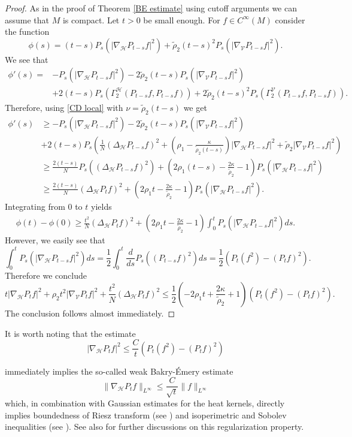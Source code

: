 \documentclass[11pt]{article}
\numberwithin{equation}{section}
\newcommand{\Ho}{\mathcal H}
\newcommand{\V}{\mathcal V}
\begin{document}
\begin{proof}
As in the proof of Theorem \ref{BE estimate} using cutoff arguments we can assume that $M$ is compact. Let $t>0$ be small enough. For $f \in C^\infty (M)$ consider the function
\[
\phi(s)= (t-s)P_s(|\nabla_\Ho P_{t-s} f|^2)+\tilde\rho_2 (t-s)^2 P_s(|\nabla_\V P_{t-s} f|^2).
\]
We see that
\begin{align*}
\phi'(s)=&-P_s(|\nabla_\Ho P_{t-s} f|^2)-2\tilde\rho_2 (t-s)P_s(|\nabla_\V P_{t-s} f|^2) \\
&+2(t-s)P_s(\Gamma^\Ho_2 (P_{t-s}f,P_{t-s} f))+2\tilde\rho_2 (t-s)^2 P_s( \Gamma_2^\V (P_{t-s} f,P_{t-s}f)).
\end{align*}
Therefore, using \eqref{CD local} with $\nu=\tilde\rho_2 (t-s)$ we get
\begin{align*}
\phi'(s) &\ge -P_s(|\nabla_\Ho P_{t-s} f|^2)-2\tilde\rho_2 (t-s)P_s(|\nabla_\V P_{t-s} f|^2) \\
&+2(t-s) P_s  \left( \frac{1}{N}(\Delta_\Ho P_{t-s}f)^2 +\left(\rho_1-\frac{\kappa}{\tilde \rho_2 (t-s)} \right) | \nabla_\Ho P_{t-s}f|^2+ \tilde{\rho}_2 | \nabla_\V P_{t-s}f|^2\right) \\
 &\ge \frac{2(t-s)}{N} P_s  \left( (\Delta_\Ho P_{t-s}f)^2\right)+ \left(2\rho_1(t-s)-\frac{2\kappa}{\tilde \rho_2 }-1 \right)P_s(|\nabla_\Ho P_{t-s} f|^2) \\
 &\ge \frac{2(t-s)}{N} (\Delta_\Ho P_{t}f)^2+ \left(2\rho_1 t -\frac{2\kappa}{\tilde \rho_2 }-1 \right)P_s(|\nabla_\Ho P_{t-s} f|^2).
\end{align*}
Integrating from $0$ to $t$ yields
\begin{align*}
\phi(t)-\phi(0) \ge \frac{t^2}{N} (\Delta_\Ho P_{t}f)^2+\left(2\rho_1 t -\frac{2\kappa}{\tilde \rho_2 }-1 \right)\int_0^t P_s(|\nabla_\Ho P_{t-s} f|^2)ds.
\end{align*}
However, we easily see that
\[
\int_0^t P_s(|\nabla_\Ho P_{t-s} f|^2)ds =\frac{1}{2} \int_0^t \frac{d}{ds} P_s ((P_{t-s}f)^2) ds= \frac{1}{2} \left( P_t(f^2)-(P_t f)^2 \right). 
\]
Therefore we conclude
\[
t | \nabla_\Ho P_t f |^2 +\rho_2 t^2 | \nabla_\V P_t f |^2+\frac{t^2}{N} (\Delta_\Ho P_{t}f)^2 \le \frac{1}{2}\left(-2\rho_1 t +\frac{2\kappa}{\tilde \rho_2 }+1 \right)\left( P_t(f^2)-(P_t f)^2 \right).
\]
The conclusion follows almost immediately.
\end{proof}

It is worth noting that the estimate 
\[
| \nabla_\Ho P_t f |^2 \le \frac{C}{t}  \left( P_t(f^2)-(P_t f)^2 \right)
\]

immediately implies the so-called weak Bakry-\'Emery estimate 
\[
\| \nabla_\Ho P_t f \|_{L^\infty} \le \frac{C}{\sqrt{t}} \| f \|_{L^\infty}
\]
which, in combination with Gaussian estimates for the heat kernels,  directly implies boundedness of Riesz transform (see \cite{BGRiesz}) and isoperimetric and Sobolev inequalities (see \cite{Alonso-Ruiz-Baudoin-Chen-2020}). See also \cite{DePontiStefani2025} for further discussions on this regularization property.
\end{document}
